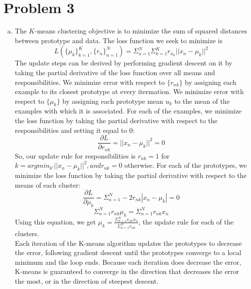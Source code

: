 \documentclass[11pt]{article}
\begin{document}
\section{Problem 3}
\begin{enumerate}[a.]
\item The $K$-means clustering objective is to minimize the sum of squared distances between prototype and data. The loss function we seek to minimize is $$L(\{\mu_k\}^K_{k=1}, \{r_n\}^N_{n = 1}) = \Sigma_{n=1}^N\Sigma_{k = 1}^K r_{n_k} ||x_n - \mu_k||^2$$ The update steps can be derived by performing gradient descent on it by taking the partial derivative of the loss function over all means and responsibilities. We minimize error with respect to $\{r_{nk}\}$ by assigning each example to its closest prototype at every itermation. We minimize error with respect to $\{\mu_k\}$ by assigning each prototype mean $u_k$ to the mean of the examples with which it is associated.
\newline \newline
For each of the examples, we minimize the loss function by taking the partial derivative with respect to the responsibilities and setting it equal to 0:
$$\frac{\partial L}{\partial r_{nk}} =  ||x_n - \mu_k||^2 = 0$$
So, our update rule for responsibilities is $r_{nk} = 1$ for $k = argmin_{k'} ||x_n - \mu_k ||^2, and r_{nk} = 0$ otherwise.
\newline \newline
For each of the prototypes, we minimize the loss function by taking the partial derivative with respect to the means of each cluster:
$$\frac{\partial L}{\partial \mu_{k}} = \Sigma^N_{n=1} -2r_{nk}|x_n - \mu_k| = 0$$
$$ \Sigma^N_{n = 1}r_{nk}\mu_k = \Sigma^N_{n = 1}r_{nk}x_n $$
Using this equation, we get $\mu_k = \frac{\Sigma^N_{n = 1} r_{nk}x_n}{\Sigma^N_{n = 1}r_{nk}}$, the update rule for each of the clusters.
\\ Each iteration of the K-means algorithm updates the prototypes to decrease the error, following gradient descent until the prototypes converge to a local minimum and the loop ends. Because each iteration does decrease the error, K-means is guaranteed to converge in the direction that decreases the error the most, or in the direction of steepest descent. 

\end{enumerate}
\end{document}
